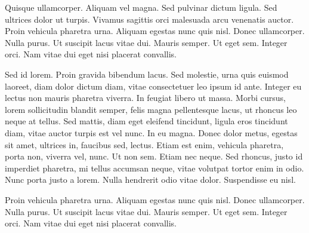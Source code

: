 Quisque ullamcorper. Aliquam vel magna. Sed pulvinar dictum
ligula. Sed ultrices dolor ut turpis. Vivamus sagittis orci malesuada
arcu venenatis auctor. Proin vehicula pharetra urna. Aliquam egestas
nunc quis nisl. Donec ullamcorper. Nulla purus. Ut suscipit lacus
vitae dui. Mauris semper. Ut eget sem. Integer orci. Nam vitae dui
eget nisi placerat convallis. 

Sed id lorem. Proin gravida bibendum lacus. Sed molestie, urna quis
euismod laoreet, diam dolor dictum diam, vitae consectetuer leo ipsum
id ante. Integer eu lectus non mauris pharetra viverra. In feugiat
libero ut massa. Morbi cursus, lorem sollicitudin blandit semper,
felis magna pellentesque lacus, ut rhoncus leo neque at tellus. Sed
mattis, diam eget eleifend tincidunt, ligula eros tincidunt diam,
vitae auctor turpis est vel nunc. In eu magna. Donec dolor metus,
egestas sit amet, ultrices in, faucibus sed, lectus. Etiam est enim,
vehicula pharetra, porta non, viverra vel, nunc. Ut non sem. Etiam nec
neque. Sed rhoncus, justo id imperdiet pharetra, mi tellus accumsan
neque, vitae volutpat tortor enim in odio. Nunc porta justo a
lorem. Nulla hendrerit odio vitae dolor. Suspendisse eu nisl.  

Proin vehicula pharetra urna. Aliquam egestas
nunc quis nisl. Donec ullamcorper. Nulla purus. Ut suscipit lacus
vitae dui. Mauris semper. Ut eget sem. Integer orci. Nam vitae dui
eget nisi placerat convallis. 
